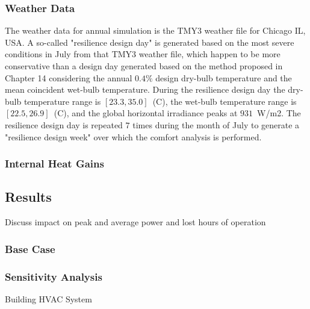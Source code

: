\subsubsection{Weather Data} \label{sec:weather}

The weather data for annual simulation is the TMY3 weather file for Chicago IL, USA.
A so-called "resilience design day" is generated based on the most severe conditions in July from that TMY3 weather file, which happen to be more conservative than a design day generated based on the method proposed in \cite{ASHRAE2017} Chapter 14 considering the annual $0.4\%$ design dry-bulb temperature and the mean coincident wet-bulb temperature.
During the resilience design day the dry-bulb temperature range is $[23.3, 35.0]$~(C), the wet-bulb temperature range is $[22.5, 26.9]$~(C), and the global horizontal irradiance peaks at $931$~W/m2.
The resilience design day is repeated $7$ times during the month of July to generate a "resilience design week" over which the comfort analysis is performed.

\subsubsection{Internal Heat Gains} \label{sec:gains}



\subsection{Results} \label{sec:results}

Discuss impact on peak and average power and lost hours of operation

\subsubsection{Base Case} \label{sec:base}


\subsubsection{Sensitivity Analysis} \label{sec:sensitivity}

Building HVAC System

